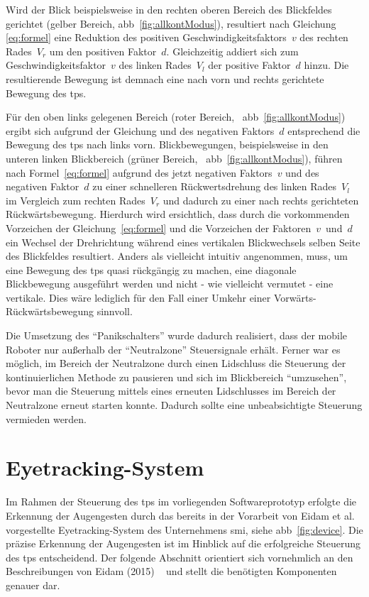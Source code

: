 Wird der Blick beispielsweise in den rechten oberen Bereich des Blickfeldes gerichtet (gelber Bereich, \vgl \acs{abb}~\ref{fig:allkontModus}), resultiert nach Gleichung \ref{eq:formel} eine Reduktion des positiven Geschwindigkeitsfaktors~$v$ des rechten Rades~$V_{r}$ um den positiven Faktor~$d$. Gleichzeitig addiert sich zum Geschwindigkeitsfaktor~$v$ des linken Rades~$V_{l}$ der positive Faktor~$d$ hinzu. Die resultierende Bewegung ist demnach eine nach vorn und rechts gerichtete Bewegung des \acs{tps}.

Für den oben links gelegenen Bereich (roter Bereich, \vgl~\acs{abb}~\ref{fig:allkontModus}) ergibt sich aufgrund der Gleichung und des negativen Faktors~$d$ entsprechend die Bewegung des \acs{tps} nach links vorn.  Blickbewegungen, beispielsweise in den unteren linken Blickbereich (grüner Bereich, \vgl~\acs{abb}~\ref{fig:allkontModus}), führen nach Formel~\ref{eq:formel} aufgrund des jetzt negativen Faktors~$v$ und des negativen Faktor~$d$ zu einer schnelleren Rückwertsdrehung des linken Rades~$V_{l}$ im Vergleich zum rechten Rades~$V_{r}$ und dadurch zu einer nach rechts gerichteten Rückwärtsbewegung. Hierdurch wird ersichtlich, dass durch die vorkommenden Vorzeichen der Gleichung~\ref{eq:formel} und die Vorzeichen der Faktoren~$v$~und~$d$ ein Wechsel der Drehrichtung während eines vertikalen Blickwechsels selben Seite des Blickfeldes resultiert. Anders als vielleicht intuitiv angenommen, muss, um eine Bewegung des \acs{tps} quasi rückgängig zu machen, eine diagonale Blickbewegung ausgeführt werden und nicht - wie vielleicht vermutet - eine vertikale. Dies wäre lediglich für den Fall einer Umkehr einer Vorwärts- \bzw Rückwärtsbewegung sinnvoll.


Die Umsetzung des \enquote{Panikschalters} wurde dadurch realisiert, dass der mobile Roboter nur außerhalb der \enquote{Neutralzone} Steuersignale erhält. Ferner war es möglich, im Bereich der Neutralzone durch einen Lidschluss die Steuerung der kontinuierlichen Methode zu pausieren und sich im Blickbereich \enquote{umzusehen}, bevor man die Steuerung mittels eines erneuten Lidschlusses im Bereich der Neutralzone erneut starten konnte. Dadurch sollte eine unbeabsichtigte Steuerung vermieden werden. 


\section{Eyetracking-System}
\label{section:eyetrackingI}
Im Rahmen der Steuerung des \acs{tps} im vorliegenden Softwareprototyp erfolgte die Erkennung der Augengesten durch das bereits in der Vorarbeit von Eidam et al. \vgl~\cite{Eidam2015} vorgestellte Eyetracking-System \iV des Unternehmens \acf{smi}, siehe \acs{abb}~\ref{fig:device}. Die präzise Erkennung der Augengesten ist im Hinblick auf die erfolgreiche Steuerung des \acs{tps} entscheidend. Der folgende Abschnitt orientiert sich vornehmlich an den Beschreibungen von Eidam (2015) \vgl~\cite{Eidam2015} und stellt die benötigten Komponenten genauer dar.

